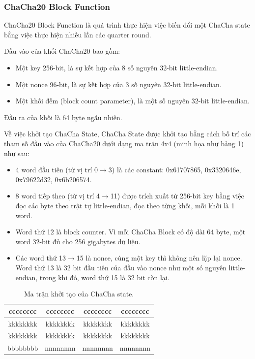 \subsubsection{ChaCha20 Block Function}

ChaCha20 Block Function là quá trình thực hiện việc biến đổi một ChaCha state bằng việc thực hiện nhiều lần các quarter round.

Đầu vào của khối ChaCha20 bao gồm:
\begin{itemize}
    \item Một key 256-bit, là sự kết hợp của 8 số nguyên 32-bit little-endian.
    \item Một nonce 96-bit, là sự kết hợp của 3 số nguyên 32-bit little-endian.
    \item Một khối đếm (block count parameter), là một số nguyên 32-bit little-endian.
\end{itemize}

Đầu ra của khối là 64 byte ngẫu nhiên.

Về việc khởi tạo ChaCha State, ChaCha State được khởi tạo bằng cách bố trí các tham số đầu vào của ChaCha20 dưới dạng ma trận 4x4 (minh họa như bảng \ref{tab:Init-CC20-State}) như sau:

\begin{itemize}
    \item 4 word đầu tiên (từ vị trí 0$\rightarrow$3) là các constant: 0x61707865, 0x3320646e, 0x79622d32, 0x6b206574.
    \item 8 word tiếp theo (từ vị trí 4$\rightarrow$11) được trích xuất từ 256-bit key bằng việc đọc các byte theo trật tự little-endian, đọc theo từng khối, mỗi khối là 1 word.
    \item Word thứ 12 là block counter. Vì mỗi ChaCha Block có độ dài 64 byte, một word 32-bit đủ cho 256 gigabytes dữ liệu. %
    \item Các word thứ 13$\rightarrow$15 là nonce, cùng một key thì không nên lặp lại nonce. Word thứ 13 là 32 bit đầu tiên của đầu vào nonce như một só nguyên little-endian, trong khi đó, word thứ 15 là 32 bit còn lại.
\end{itemize}

\begin{table}[ht]
\caption{Ma trận khởi tạo của ChaCha state.}

\label{tab:Init-CC20-State}%
\begin{center}
\begin{tabular}{|c|c|c|c|}
\hline
cccccccc & cccccccc & cccccccc & cccccccc \\ \hline
kkkkkkkk & kkkkkkkk & kkkkkkkk & kkkkkkkk \\ \hline
kkkkkkkk & kkkkkkkk & kkkkkkkk & kkkkkkkk \\ \hline
bbbbbbbb & nnnnnnnn & nnnnnnnn & nnnnnnnn \\ \hline
\end{tabular}
\end{center}
\end{table}

